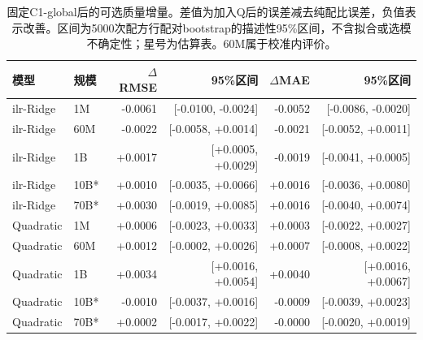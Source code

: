 \begin{table}[htbp]
\centering
\small
\caption{固定C1-global后的可选质量增量。差值为加入Q后的误差减去纯配比误差，负值表示改善。区间为5000次配方行配对bootstrap的描述性95\%区间，不含拟合或选模不确定性；星号为估算表。60M属于校准内评价。}
\label{tab:q1-optional-quality}
\begin{tabular}{llrrrr}
\hline
模型 & 规模 & $\Delta$RMSE & 95\%区间 & $\Delta$MAE & 95\%区间 \\
\hline
ilr-Ridge & 1M & -0.0061 & [-0.0100, -0.0024] & -0.0052 & [-0.0086, -0.0020] \\
ilr-Ridge & 60M & -0.0022 & [-0.0058, +0.0014] & -0.0021 & [-0.0052, +0.0011] \\
ilr-Ridge & 1B & +0.0017 & [+0.0005, +0.0029] & -0.0019 & [-0.0041, +0.0005] \\
ilr-Ridge & 10B* & +0.0010 & [-0.0035, +0.0066] & +0.0016 & [-0.0036, +0.0080] \\
ilr-Ridge & 70B* & +0.0030 & [-0.0019, +0.0085] & +0.0016 & [-0.0040, +0.0074] \\
Quadratic & 1M & +0.0006 & [-0.0023, +0.0033] & +0.0003 & [-0.0022, +0.0027] \\
Quadratic & 60M & +0.0012 & [-0.0002, +0.0026] & +0.0007 & [-0.0008, +0.0022] \\
Quadratic & 1B & +0.0034 & [+0.0016, +0.0054] & +0.0040 & [+0.0016, +0.0067] \\
Quadratic & 10B* & -0.0010 & [-0.0037, +0.0016] & -0.0009 & [-0.0039, +0.0023] \\
Quadratic & 70B* & +0.0002 & [-0.0017, +0.0022] & -0.0000 & [-0.0020, +0.0019] \\
\hline
\end{tabular}
\end{table}
